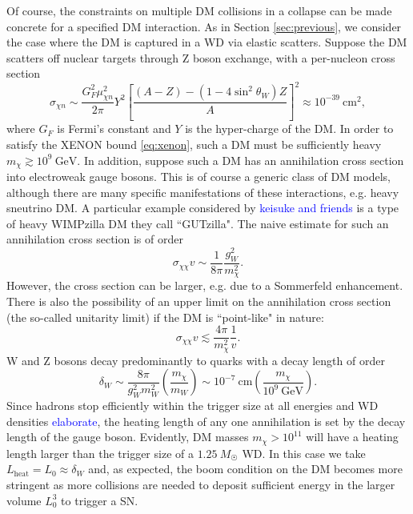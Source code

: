 \documentclass[preprintnumbers,amsmath,amssymb,prd,superscriptaddress]{revtex4}
\newcommand{\GeV}{\text{GeV}}
\newcommand{\cm}{\text{cm}}
\def\r{\right)}
\def\l{\left(}
\begin{document}
Of course, the constraints on multiple DM collisions in a collapse can be made concrete for a specified DM interaction. 
As in Section \ref{sec:previous}, we consider the case where the DM is captured in a WD via elastic scatters. 
Suppose the DM scatters off nuclear targets through Z boson exchange, with a per-nucleon cross section
\begin{equation}
\label{eq:Zscattering}
\sigma_{\chi n} \sim \frac{G_F^2 \mu_{\chi n}^2}{2\pi} Y^2 \left [\frac{(A-Z) - (1-4 \sin^2{\theta_W})Z}{A} \right ]^2 \approx 10^{-39} ~\cm^2,
\end{equation}
where $G_F$ is Fermi's constant and $Y$ is the hyper-charge of the DM. 
In order to satisfy the XENON bound \eqref{eq:xenon}, such a DM must be sufficiently heavy $m_\chi \gtrsim 10^9 ~\GeV$. 
In addition, suppose such a DM has an annihilation cross section into electroweak gauge bosons.
This is of course a generic class of DM models, although there are many specific manifestations of these interactions, e.g. heavy sneutrino DM. 
A particular example considered by \textcolor{blue}{keisuke and friends} is a type of heavy WIMPzilla DM they call ``GUTzilla".
The naive estimate for such an annihilation cross section is of order
\begin{equation}
\sigma_{\chi \chi} v \sim \frac{1}{8\pi} \frac{g_W^2}{m_\chi^2}.
\end{equation}
However, the cross section can be larger, e.g. due to a Sommerfeld enhancement. 
There is also the possibility of an upper limit on the annihilation cross section (the so-called unitarity limit) if the DM is ``point-like" in nature:
\begin{equation}
\sigma_{\chi \chi} v \lesssim \frac{4 \pi}{m_\chi^2} \frac{1}{v}.
\end{equation}
W and Z bosons decay predominantly to quarks with a decay length of order
\begin{equation}
\delta_W \sim \frac{8\pi}{g_W^2 m_W^2} \l \frac{m_\chi}{m_W} \r \sim 10^{-7} ~\cm \l \frac{m_\chi}{10^{9} ~\GeV} \r. 
\end{equation}
Since hadrons stop efficiently within the trigger size at all energies and WD densities \textcolor{blue}{elaborate}, the heating length of any one annihilation is set by the decay length of the gauge boson. 
Evidently, DM masses $m_\chi > 10^{11}$ will have a heating length larger than the trigger size of a $1.25~M_{\astrosun}$ WD.
In this case we take $L_\text{heat} = L_0 \approx \delta_W$ and, as expected, the boom condition on the DM becomes more stringent as more collisions are needed to deposit sufficient energy in the larger volume $L_0^3$ to trigger a SN. 
\end{document}
